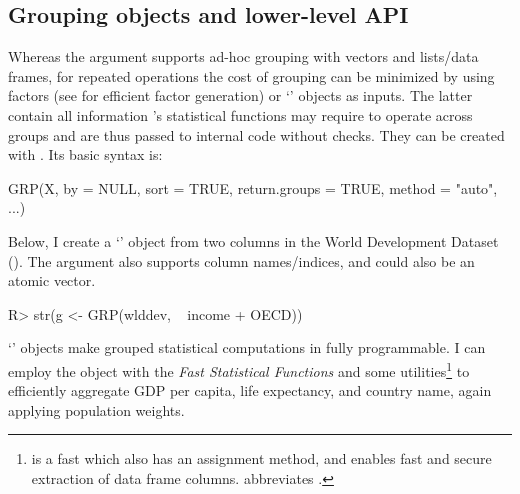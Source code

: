 \documentclass[nojss]{jss} %
\newcommand{\class}[1]{`\code{#1}'}
\newcommand{\fct}[1]{\code{#1()}}
\begin{document}
\subsection{Grouping objects and lower-level API} \label{ssec:gopt}
%
Whereas the  argument supports ad-hoc grouping with vectors and lists/data frames, for repeated operations the cost of grouping can be minimized by using factors (see  for efficient factor generation) or \class{GRP} objects as inputs. The latter contain all information 's statistical functions may require to operate across groups and are thus passed to internal  code without checks. They can be created with . Its basic syntax is:
\begin{Code}
GRP(X, by = NULL, sort = TRUE, return.groups = TRUE, method = "auto", ...)
\end{Code}
 Below, I create a \class{GRP} object from two columns in the World Development Dataset (\href{https://sebkrantz.github.io/collapse/reference/wlddev.html}{}). The  argument also supports column names/indices, and  could also be an atomic vector.
%
\begin{Schunk}
\begin{Sinput}
R> str(g <- GRP(wlddev, ~ income + OECD))
\end{Sinput}
\end{Schunk}
%
\class{GRP} objects make grouped statistical computations in  fully programmable. I can employ the object with the \emph{Fast Statistical Functions} and some utilities\footnote{\fct{add\_vars} is a fast \fct{cbind.data.frame} which also has an assignment method, and \fct{get\_vars} enables fast and secure extraction of data frame columns.  abbreviates .} to efficiently aggregate GDP per capita, life expectancy, and country name, again applying population weights.
\end{document}
